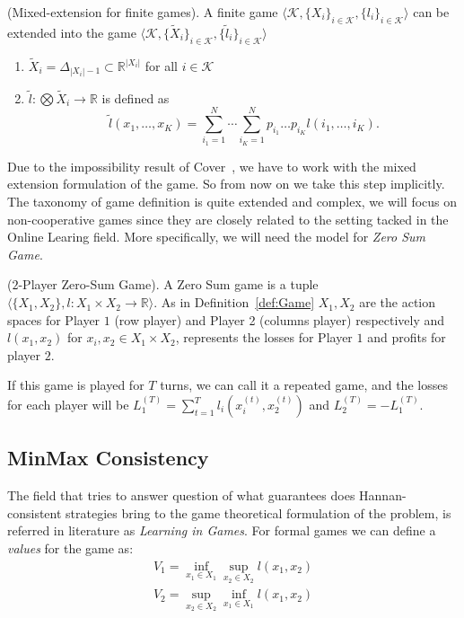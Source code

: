 \begin{definition}(Mixed-extension for finite games).
A finite game $\langle\mathcal K,\{X_i\}_{i\in\mathcal K},\{l_i\}_{i\in\mathcal K}\rangle$ can be extended into the game $\langle\mathcal K,\{\tilde X_i\}_{i\in\mathcal K},\{\tilde l_i\}_{i\in\mathcal K}\rangle$
\begin{enumerate}
	\item $\tilde X_i=\Delta_{|X_i|-1}\subset \mathbb R^{|X_i|}$ for all $i\in\mathcal K$ 
	\item $\tilde l:\bigotimes \tilde X_i\to\mathbb R$ is defined as
	$$\tilde l(x_1,\ldots,x_K)=\sum\limits_{i_1=1}^N\cdots\sum\limits_{i_K=1}^Np_{i_1}\ldots p_{i_K}l(i_1,\ldots,i_K).$$ 
\end{enumerate}
\end{definition}

Due to the impossibility result of Cover~\cite{cover1966behavior}, we have to work with the mixed extension formulation of the game. So from now on we take this step implicitly.
The taxonomy of game definition is quite extended and complex, we will focus on non-cooperative games  since they are closely related to the setting tacked in the Online Learing field. More specifically, we will need the model for \emph{Zero Sum Game}. 

\begin{definition}($2$-Player Zero-Sum Game).\label{def:ZSG}
A Zero Sum game is a tuple $\langle\{X_1,X_2\},l:X_1\times X_2\to\mathbb R\rangle$. As in Definition~\ref{def:Game} $X_1,X_2$ are the action spaces for Player $1$ (row player) and Player 2 (columns player) respectively and $l(x_1,x_2)$ for $x_i,x_2\in X_1\times X_2$, represents the losses for Player $1$ and profits for player $2$.
\end{definition}

If this game is played for $T$ turns, we can call it a repeated game, and the losses for each player will be $L_1^{(T)}=\sum\limits_{t=1}^Tl_i\left(x_i^{(t)},x_2^{(t)}\right)$ and $L_2^{(T)}=-L_1^{(T)}$. 


\subsection{MinMax Consistency}
The field that tries to answer question of what guarantees does Hannan-consistent strategies bring to the game theoretical formulation of the problem, is referred in literature as \emph{Learning in Games}.
For formal games we can define a \emph{values} for the game as: 
\begin{align}
    V_1=\inf\limits_{x_1\in X_1}\sup\limits_{x_2\in X_2}l(x_1,x_2)\\
	V_2=\sup\limits_{x_2\in X_2}\inf\limits_{x_1\in X_1}l(x_1,x_2)
\end{align}


